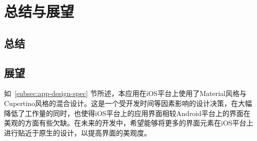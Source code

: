 \chapter{总结与展望}\label{ch:conc}


\section{总结}\label{sec:conc}



\section{展望}\label{sec:pros}


如~\ref{subsec:app-design-spec} 节所述，本应用在iOS平台上使用了Material风格与Cupertino风格的混合设计。这是一个受开发时间等因素影响的设计决策，在大幅降低了工作量的同时，也使得iOS平台上的应用界面相较Android平台上的界面在美观的方面有些欠缺。在未来的开发中，希望能够将更多的界面元素在iOS平台上进行贴近于原生的设计，以提高界面的美观度。


